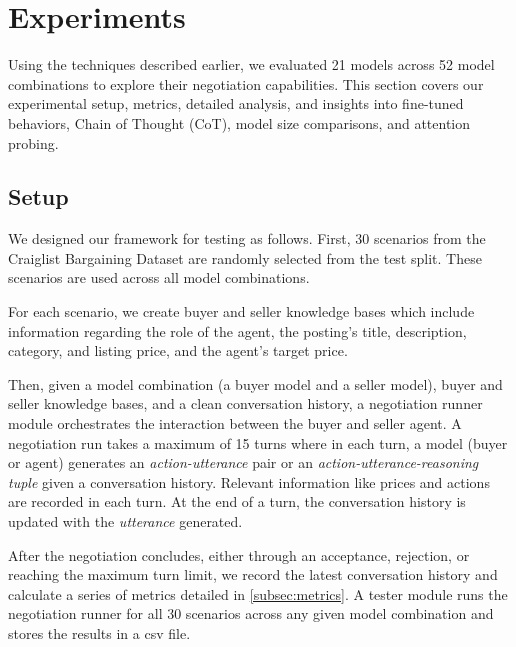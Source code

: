 \documentclass[11pt]{article}
\begin{document}

\section{Experiments}
Using the techniques described earlier, we evaluated 21 models across 52 model combinations to explore their negotiation capabilities. This section covers our experimental setup, metrics, detailed analysis, and insights into fine-tuned behaviors, Chain of Thought (CoT), model size comparisons, and attention probing.


\subsection{Setup}
We designed our framework for testing as follows. First, 30 scenarios from the Craiglist Bargaining Dataset are randomly selected from the test split. These scenarios are used across all model combinations. 

For each scenario, we create buyer and seller knowledge bases which include information regarding the role of the agent, the posting's title, description, category, and listing price, and the agent's target price. 

Then, given a model combination (a buyer model and a seller model), buyer and seller knowledge bases, and a clean conversation history, a negotiation runner module orchestrates the interaction between the buyer and seller agent. A negotiation run takes a maximum of 15 turns where in each turn, a model (buyer or agent) generates an \textit{action-utterance} pair or an \textit{action-utterance-reasoning tuple} given a conversation history. Relevant information like prices and actions are recorded in each turn. At the end of a turn, the conversation history is updated with the \textit{utterance} generated.

After the negotiation concludes, either through an acceptance, rejection, or reaching the maximum turn limit, we record the latest conversation history and calculate a series of metrics detailed in \ref{subsec:metrics}. A tester module runs the negotiation runner for all 30 scenarios across any given model combination and stores the results in a csv file. 
\end{document}
